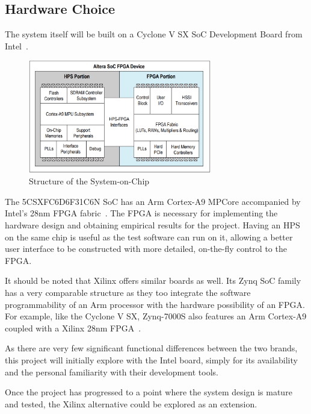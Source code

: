 \subsection{Hardware Choice}
The system itself will be built on a Cyclone V SX SoC Development Board from
Intel~\cite{Intel1}.

\begin{figure}[H]
  \centering
  \includegraphics[width=8cm]{img/SoCStructure}
  \caption{Structure of the System-on-Chip}
  \label{SoCStructure}
\end{figure}

The 5CSXFC6D6F31C6N SoC has an Arm Cortex-A9 MPCore accompanied by Intel's 28nm
FPGA fabric~\cite{Altera1}.
The FPGA is necessary for implementing the hardware design and obtaining
empirical results for the project.
Having an HPS on the same chip is useful as the test software can run on it,
allowing a better user interface to be constructed with more detailed,
on-the-fly control to the FPGA.

It should be noted that Xilinx offers similar boards as well. Its Zynq SoC
family has a very comparable structure as they too integrate the software
programmability of an Arm processor with the hardware possibility of an FPGA.
For example, like the Cyclone V SX, Zynq-7000S also features an Arm Cortex-A9
coupled with a Xilinx 28nm FPGA~\cite{Xilinx1}.

As there are very few significant functional differences between the two brands,
this project will initially explore with the Intel board, simply for its
availability and the personal familiarity with their development tools.

Once the project has progressed to a point where the system design is mature and
tested, the Xilinx alternative could be explored as an extension.

